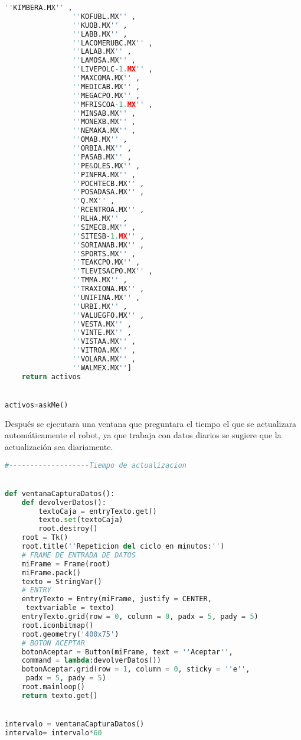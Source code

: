 \documentclass[letterpaper,12pt,oneside]{book}
\begin{document}
\begin{lstlisting}[language=Python]
                ''KIMBERA.MX'' , 
                ''KOFUBL.MX'' , 
                ''KUOB.MX'' , 
                ''LABB.MX'' , 
                ''LACOMERUBC.MX'' , 
                ''LALAB.MX'' , 
                ''LAMOSA.MX'' , 
                ''LIVEPOLC-1.MX'' , 
                ''MAXCOMA.MX'' , 
                ''MEDICAB.MX'' , 
                ''MEGACPO.MX'' , 
                ''MFRISCOA-1.MX'' , 
                ''MINSAB.MX'' , 
                ''MONEXB.MX'' , 
                ''NEMAKA.MX'' , 
                ''OMAB.MX'' , 
                ''ORBIA.MX'' , 
                ''PASAB.MX'' , 
                ''PE&OLES.MX'' , 
                ''PINFRA.MX'' , 
                ''POCHTECB.MX'' , 
                ''POSADASA.MX'' , 
                ''Q.MX'' , 
                ''RCENTROA.MX'' , 
                ''RLHA.MX'' , 
                ''SIMECB.MX'' , 
                ''SITESB-1.MX'' , 
                ''SORIANAB.MX'' , 
                ''SPORTS.MX'' , 
                ''TEAKCPO.MX'' , 
                ''TLEVISACPO.MX'' , 
                ''TMMA.MX'' , 
                ''TRAXIONA.MX'' , 
                ''UNIFINA.MX'' , 
                ''URBI.MX'' , 
                ''VALUEGFO.MX'' , 
                ''VESTA.MX'' , 
                ''VINTE.MX'' ,
                ''VISTAA.MX'' , 
                ''VITROA.MX'' , 
                ''VOLARA.MX'' , 
                ''WALMEX.MX'']
    return activos


activos=askMe()

\end{lstlisting}

Después se ejecutara una ventana que preguntara el tiempo el que se actualizara automáticamente el robot, ya que trabaja con datos diarios se sugiere que la actualización sea diariamente. 


\begin{lstlisting}[language=Python]
#-------------------Tiempo de actualizacion


def ventanaCapturaDatos():
    def devolverDatos():
        textoCaja = entryTexto.get()
        texto.set(textoCaja)
        root.destroy()
    root = Tk()
    root.title(''Repeticion del ciclo en minutos:'')
    # FRAME DE ENTRADA DE DATOS
    miFrame = Frame(root)
    miFrame.pack()
    texto = StringVar()
    # ENTRY 
    entryTexto = Entry(miFrame, justify = CENTER,
     textvariable = texto)
    entryTexto.grid(row = 0, column = 0, padx = 5, pady = 5)
    root.iconbitmap()        
    root.geometry('400x75')
    # BOTON ACEPTAR
    botonAceptar = Button(miFrame, text = ''Aceptar'', 
    command = lambda:devolverDatos())
    botonAceptar.grid(row = 1, column = 0, sticky = ''e'',
     padx = 5, pady = 5)
    root.mainloop()
    return texto.get()


intervalo = ventanaCapturaDatos()
intervalo= intervalo*60
\end{lstlisting}
\end{document}
